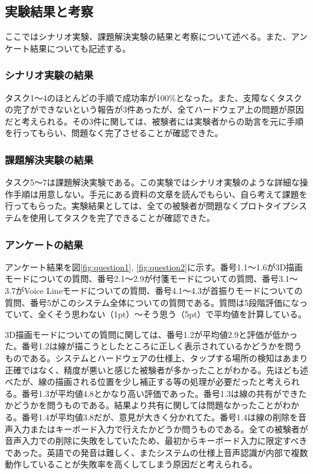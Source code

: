 \documentclass[technicalreport]{ieicej}
\begin{document}
\subsection{実験結果と考察}
ここではシナリオ実験、課題解決実験の結果と考察について述べる。また、アンケート結果についても記述する。

\subsubsection{シナリオ実験の結果}
タスク1～4のほとんどの手順で成功率が100\%となった。また、支障なくタスクの完了ができないという報告が3件あったが、全てハードウェア上の問題が原因だと考えられる。その3件に関しては、被験者には実験者からの助言を元に手順を行ってもらい、問題なく完了させることが確認できた。

\subsubsection{課題解決実験の結果}
タスク5～7は課題解決実験である。この実験ではシナリオ実験のような詳細な操作手順は用意しない。手元にある資料の文章を読んでもらい、自ら考えて課題を行ってもらった。実験結果としては、全ての被験者が問題なくプロトタイプシステムを使用してタスクを完了できることが確認できた。

\subsubsection{アンケートの結果}
アンケート結果を図\ref{fig:question1}, \ref{fig:question2}に示す。番号1.1～1.6が3D描画モードについての質問、番号2.1～2.9が付箋モードについての質問、番号3.1～3.7がVoice Lineモードについての質問、番号4.1～4.3が首振りモードについての質問、番号5がこのシステム全体についての質問である。質問は5段階評価になっていて、全くそう思わない（1pt）～そう思う（5pt）で平均値を計算している。

3D描画モードについての質問に関しては、番号1.2が平均値2.9と評価が低かった。番号1.2は線が描こうとしたところに正しく表示されているかどうかを問うものである。システムとハードウェアの仕様上、タップする場所の検知はあまり正確ではなく、精度が悪いと感じた被験者が多かったことがわかる。先ほども述べたが、線の描画される位置を少し補正する等の処理が必要だったと考えられる。番号1.3が平均値4.8とかなり高い評価であった。番号1.3は線の共有ができたかどうかを問うものである。結果より共有に関しては問題なかったことがわかる。番号1.4が平均値3.8だが、意見が大きく分かれてた。番号1.4は線の削除を音声入力またはキーボード入力で行えたかどうか問うものである。全ての被験者が音声入力での削除に失敗をしていたため、最初からキーボード入力に限定すべきであった。英語での発音は難しく、またシステムの仕様上音声認識が内部で複数動作していることが失敗率を高くしてしまう原因だと考えられる。
\end{document}
